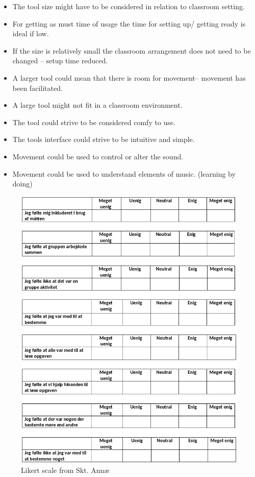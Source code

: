 \begin{itemize}
\item	The tool size might have to be considered in relation to classroom setting. 
\item	For getting as must time of usage the time for setting up/ getting ready is ideal if low. 
\item	If the size is relatively small the classroom arrangement does not need to be changed – setup time reduced. 
\item	A larger tool could mean that there is room for movement– movement has been facilitated. 
\item	A large tool might not fit in a classroom environment.
\item	The tool could strive to be considered comfy to use.   
\item	The tools interface could strive to be intuitive and simple.
\item	Movement could be used to control or alter the sound. 
\item	Movement could be used to understand elements of music. (learning by doing) 
\end{itemize}


\begin{figure}[H]
	\centering
	\includegraphics[width=0.9\linewidth]{figure/Appendices/simonsDoc.png}
	\caption{Likert scale from Skt. Annæ}
	\label{fig:likertScale}
\end{figure}

